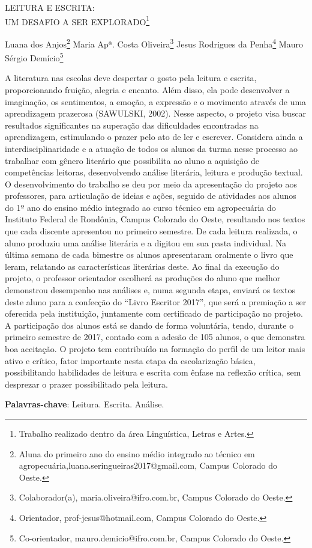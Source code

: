 \documentclass[article,12pt,onesidea,4paper,english,brazil]{abntex2}
\begin{document}
	
	
	\frenchspacing 
	
	\begin{center}
		\LARGE LEITURA E ESCRITA:\\UM DESAFIO A SER EXPLORADO\footnote{Trabalho realizado dentro da área Linguística, Letras e Artes.}
		
		\normalsize
	Luana dos Anjos\footnote{Aluna do primeiro ano do ensino médio integrado ao técnico em agropecuária,luana.seringueiras2017@gmail.com, Campus Colorado do Oeste.} 
	Maria Apª. Costa Oliveira\footnote{Colaborador(a), maria.oliveira@ifro.com.br, Campus Colorado do Oeste.} 
	Jesus Rodrigues da Penha\footnote{Orientador, prof-jesus@hotmail.com, Campus Colorado do Oeste.} 
	Mauro Sérgio Demício\footnote{Co-orientador, mauro.demicio@ifro.com.br, Campus Colorado do Oeste.} 
	\end{center}
	
	\noindent A literatura nas escolas deve despertar o gosto pela leitura e escrita, proporcionando
	fruição, alegria e encanto. Além disso, ela pode desenvolver a imaginação, os
	sentimentos, a emoção, a expressão e o movimento através de uma aprendizagem
	prazerosa (SAWULSKI, 2002). Nesse aspecto, o projeto visa buscar resultados
	significantes na superação das dificuldades encontradas na aprendizagem,
	estimulando o prazer pelo ato de ler e escrever. Considera ainda a
	interdisciplinaridade e a atuação de todos os alunos da turma nesse processo ao
	trabalhar com gênero literário que possibilita ao aluno a aquisição de competências
	leitoras, desenvolvendo análise literária, leitura e produção textual. O
	desenvolvimento do trabalho se deu por meio da apresentação do projeto aos
	professores, para articulação de ideias e ações, seguido de atividades aos alunos do
	1º ano do ensino médio integrado ao curso técnico em agropecuária do Instituto
	Federal de Rondônia, Campus Colorado do Oeste, resultando nos textos que cada
	discente apresentou no primeiro semestre. De cada leitura realizada, o aluno
	produziu uma análise literária e a digitou em sua pasta individual. Na última semana
	de cada bimestre os alunos apresentaram oralmente o livro que leram, relatando as
	características literárias deste. Ao final da execução do projeto, o professor
	orientador escolherá as produções do aluno que melhor demonstrou desempenho
	nas análises e, numa segunda etapa, enviará os textos deste aluno para a
	confecção do “Livro Escritor 2017”, que será a premiação a ser oferecida pela
	instituição, juntamente com certificado de participação no projeto. A participação dos
	alunos está se dando de forma voluntária, tendo, durante o primeiro semestre de
	2017, contado com a adesão de 105 alunos, o que demonstra boa aceitação. O
	projeto tem contribuído na formação do perfil de um leitor mais ativo e crítico, fator
	importante nesta etapa da escolarização básica, possibilitando habilidades de leitura
	e escrita com ênfase na reflexão crítica, sem desprezar o prazer possibilitado pela
	leitura.
	
	\vspace{\onelineskip}
	
	\noindent
	\textbf{Palavras-chave}: Leitura. Escrita. Análise.
	
\end{document}
